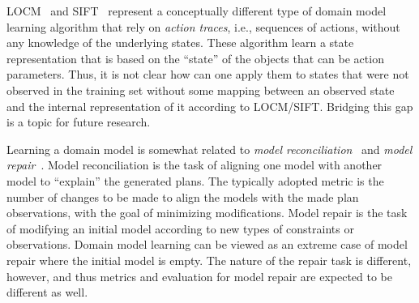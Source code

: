 \documentclass[letterpaper]{article} %
\newif\ifaddcomments
\newcommand{\roni}[1]{\ifaddcomments{\textcolor{red}{[Roni: #1]}}\fi}
\newcommand{\yarin}[1]{\ifaddcomments{\textcolor{teal}{[Yarin: #1]}}\fi}
\newcommand{\leo}[1]{\ifaddcomments{\textcolor{pink}{[Leonardo: #1]}}\fi}
\begin{document}
LOCM~\citep{cresswell2011generalised,cresswell2013acquiring} and SIFT~\citep{gosgens2024learning} represent a conceptually different type of domain model learning algorithm that rely on \emph{action traces}, i.e., sequences of actions, without any knowledge of the underlying states. 
These algorithm learn a state representation that is based on the ``state'' of the objects that can be action parameters. 
Thus, it is not clear how can one apply them to states that were not observed in the training set without some mapping between an observed state and the internal representation of it according to LOCM/SIFT. Bridging this gap is a topic for future research.  
\roni{Super important: read the above paragraph and comment/edit}


Learning a domain model is somewhat related to  \emph{model reconciliation}~\citep[inter alia]{ChakrabortiSZK17,SreedharanHMK19} and \emph{model repair}~\citep{bercher2025aSurvey}. 
Model reconciliation is the task of aligning one model with another model to ``explain'' the generated plans. 
The typically adopted metric is 
the number of changes to be made to align the models with the made plan observations, with the goal of minimizing modifications.
Model repair is the task of modifying an initial model according to new types of constraints or observations. Domain model learning can be viewed as an extreme case of model repair where the initial model is empty. 
The nature of the repair task is different, however, and thus metrics and evaluation for model repair are expected to be different as well. 
\end{document}
